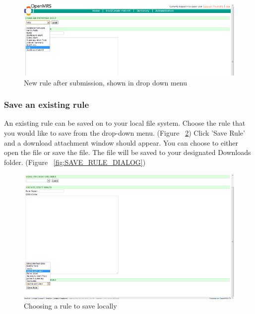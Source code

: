 \documentclass[12pt,letterpaper]{article}
\begin{document}
\begin{figure}\begin{center}
\includegraphics[width=6.5in]{user_guide/new_rule_success.png}
\end{center}
\caption{New rule after submission, shown in drop down menu}
\label{fig:NEW_RULE_SUCCESS}
\end{figure}

\subsubsection{Save an existing rule}
An existing rule can be saved on to your local file system. Choose the rule that you would like to save from the drop-down menu.
(Figure ~\ref{fig:SAVE_RULE})
Click 'Save Rule' and a download attachment window should appear. You can choose to either open the file or save the file. The file will be saved to your designated Downloads folder.
(Figure ~\ref{fig:SAVE_RULE_DIALOG})

\begin{figure}\begin{center}
\includegraphics[width=6.5in]{user_guide/save_rule.png}
\end{center}
\caption{Choosing a rule to save locally}
\label{fig:SAVE_RULE}
\end{figure}
\end{document}
